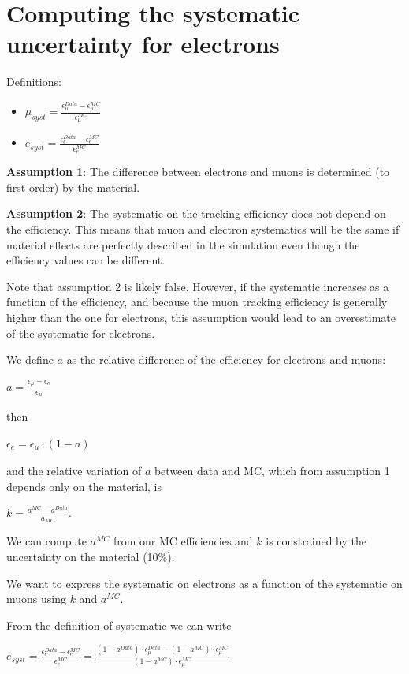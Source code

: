 \documentclass[letterpaper,10pt,english]{/Library/Python/2.7/site-packages/sphinx/texinputs/sphinxhowto}
\begin{document}
        
    
\section{Computing the systematic uncertainty for electrons}Definitions:

\begin{itemize}
\itemsep1pt\parskip0pt
\item
  $\mu_{syst} = \frac{\epsilon_{\mu}^{Data} - \epsilon_{\mu}^{MC}}{\epsilon_{\mu}^{MC}}$
\item
  $e_{syst} = \frac{\epsilon_{e}^{Data} - \epsilon_{e}^{MC}}{\epsilon_{e}^{MC}}$
\end{itemize}

\textbf{Assumption 1}: The difference between electrons and muons is
determined (to first order) by the material.

\textbf{Assumption 2}: The systematic on the tracking efficiency does
not depend on the efficiency. This means that muon and electron
systematics will be the same if material effects are perfectly described
in the simulation even though the efficiency values can be different.

Note that assumption 2 is likely false. However, if the systematic
increases as a function of the efficiency, and because the muon tracking
efficiency is generally higher than the one for electrons, this
assumption would lead to an overestimate of the systematic for
electrons.

We define $a$ as the relative difference of the efficiency for electrons
and muons:

$a = \frac{\epsilon_{\mu} - \epsilon_{e}}{\epsilon_{\mu}}$

then

$\epsilon_{e} = \epsilon_{\mu}\cdot(1 - a)$

and the relative variation of $a$ between data and MC, which from
assumption 1 depends only on the material, is

$k = \frac{a^{MC} - a^{Data}}{a_{MC}}$.

We can compute $a^{MC}$ from our MC efficiencies and $k$ is constrained
by the uncertainty on the material (10\%).

We want to express the systematic on electrons as a function of the
systematic on muons using $k$ and $a^{MC}$.

From the definition of systematic we can write

$e_{syst} = \frac{\epsilon_{e}^{Data} - \epsilon_{e}^{MC}}{\epsilon_{e}^{MC}} = \frac{(1-a^{Data})\cdot\epsilon_{\mu}^{Data} - (1-a^{MC})\cdot\epsilon_{\mu}^{MC}}{(1-a^{MC})\cdot\epsilon_{\mu}^{MC}}$
\end{document}
